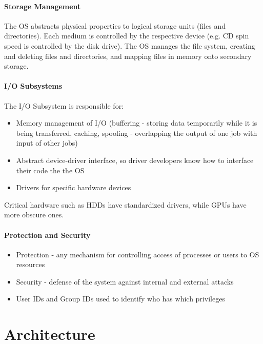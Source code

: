 \documentclass{article}
\begin{document}
\paragraph{Storage Management} The OS abstracts physical properties to logical storage units (files and directories). Each medium is controlled by the respective device (e.g. CD spin speed is controlled by the disk drive). The OS manages the file system, creating and deleting files and directories, and mapping files in memory onto secondary storage.
\paragraph{I/O Subsystems} The I/O Subsystem is responsible for:
\begin{itemize}
\item Memory management of I/O (buffering - storing data temporarily while it is being transferred, caching, spooling - overlapping the output of one job with input of other jobs)
\item Abstract device-driver interface, so driver developers know how to interface their code the the OS
\item Drivers for specific hardware devices
\end{itemize}
Critical hardware such as HDDs have standardized drivers, while GPUs have more obscure ones.
\paragraph{Protection and Security}
\begin{itemize}
\item Protection - any mechanism for controlling access of processes or users to OS resources
\item Security - defense of the system against internal and external attacks
\item User IDs and Group IDs used to identify who has which privileges
\end{itemize}

\section{Architecture}
\end{document}
